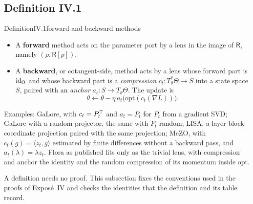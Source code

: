 
\subsection{Definition IV.1}\label{proof:IV.1}

\begin{restate}{Definition}{IV.1}{forward and backward methods}
\begin{itemize}
  \item A \textbf{forward} method acts on the parameter port by a lens in the image of $\mathsf R$, namely
  $(\rho,\mathsf R[\rho])$.
  \item A \textbf{backward}, or cotangent-side, method acts by a lens whose forward part is $\mathrm{id}_\Theta$ and whose
  backward part is a \emph{compression} $c_t:T^*_\theta\Theta\to S$ into a state space $S$, paired with an
  \emph{anchor} $a_t:S\to T_\theta\Theta$. The update is
  \[\theta\leftarrow\theta-\eta\,a_t\big(\mathrm{opt}(c_t(\nabla L))\big).\]
\end{itemize}
Examples: GaLore, with $c_t=P_t^{\top}$ and $a_t=P_t$ for $P_t$ from a gradient SVD; GaLore with a random projector, the same
with $P_t$ random; LISA, a layer-block coordinate projection paired with the same projection; MeZO, with
$c_t(g)=\langle z_t,g\rangle$ estimated by finite differences without a backward pass, and $a_t(\lambda)=\lambda z_t$.
Flora as published fits only as the trivial lens, with compression and anchor the identity and the random compression of
its momentum inside $\mathrm{opt}$.
\end{restate}

A definition needs no proof. This subsection fixes the conventions used in the proofs of Exposé~IV and checks the
identities that the definition and its table record.


